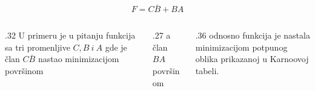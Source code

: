\begin{frame}[label=02-s052]
\gusttekst
\[
F=C\bar B+BA
\]
\begin{columns}[T,onlytextwidth]
\begin{column}{.32\textwidth}
U primeru je u pitanju funkcija sa tri promenljive \(C,B\ i\ A\) gde je član \(C\bar B\) nastao minimizacijom površinom
\par\centering

\end{column}
\begin{column}{.27\textwidth}
a član \(BA\) površinom
\par\centering

\end{column}
\begin{column}{.36\textwidth}
odnosno funkcija je nastala minimizacijom potpunog oblika prikazanoj u Karnoovoj tabeli.
\par\centering

\end{column}
\end{columns}
\end{frame}
